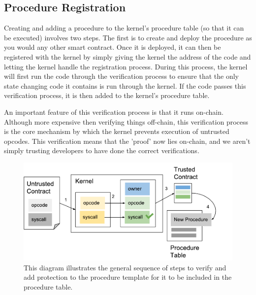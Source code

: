 \documentclass[english,a4paper]{article}
\begin{document}
\subsection{Procedure Registration}\label{procedure-creation}
Creating and adding a procedure to the kernel's procedure table (so that it can
be executed) involves two steps. The first is to create and deploy the procedure
as you would any other smart contract. Once it is deployed, it can then be
registered with the kernel by simply giving the kernel the address of the code
and letting the kernel handle the registration process. During this process, the
kernel will first run the code through the verification process to ensure that
the only state changing code it contains is run through the kernel. If the code
passes this verification process, it is then added to the kernel's procedure
table.

An important feature of this verification process is that it runs on-chain.
Although more expensive then verifying things off-chain, this verification
process is the core mechanism by which the kernel prevents execution of
untrusted opcodes. This verification means that the 'proof' now lies on-chain,
and we aren't simply trusting developers to have done the correct verifications.

\begin{figure}[htbp]
\centering
\includegraphics[width=1\textwidth]{media/ProcedureCreation.pdf}
\caption{This diagram illustrates the general sequence of steps to
verify and add protection to the procedure template for it to be
included in the procedure table.}
\end{figure}
\end{document}
